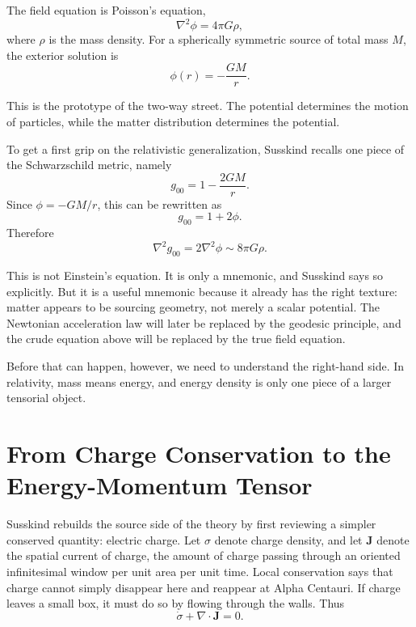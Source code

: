 The field equation is Poisson's equation,
\begin{equation}
\nabla^2\phi = 4\pi G\rho,
\end{equation}
where \(\rho\) is the mass density. For a spherically symmetric source of total mass \(M\), the exterior solution is
\begin{equation}
\phi(r) = -\frac{GM}{r}.
\end{equation}

This is the prototype of the two-way street. The potential determines the motion of particles, while the matter distribution determines the potential.

To get a first grip on the relativistic generalization, Susskind recalls one piece of the Schwarzschild metric, namely
\begin{equation}
g_{00} = 1-\frac{2GM}{r}.
\end{equation}
Since \(\phi=-GM/r\), this can be rewritten as
\begin{equation}
g_{00}=1+2\phi.
\end{equation}
Therefore
\begin{equation}
\nabla^2 g_{00} = 2\nabla^2\phi \sim 8\pi G\rho.
\end{equation}

This is not Einstein's equation. It is only a mnemonic, and Susskind says so explicitly. But it is a useful mnemonic because it already has the right texture: matter appears to be sourcing geometry, not merely a scalar potential. The Newtonian acceleration law will later be replaced by the geodesic principle, and the crude equation above will be replaced by the true field equation.

Before that can happen, however, we need to understand the right-hand side. In relativity, mass means energy, and energy density is only one piece of a larger tensorial object.

\section{From Charge Conservation to the Energy-Momentum Tensor}

Susskind rebuilds the source side of the theory by first reviewing a simpler conserved quantity: electric charge. Let \(\sigma\) denote charge density, and let \(\mathbf J\) denote the spatial current of charge, the amount of charge passing through an oriented infinitesimal window per unit area per unit time. Local conservation says that charge cannot simply disappear here and reappear at Alpha Centauri. If charge leaves a small box, it must do so by flowing through the walls. Thus
\begin{equation}
\dot{\sigma}+\nabla\cdot\mathbf J = 0.
\end{equation}

